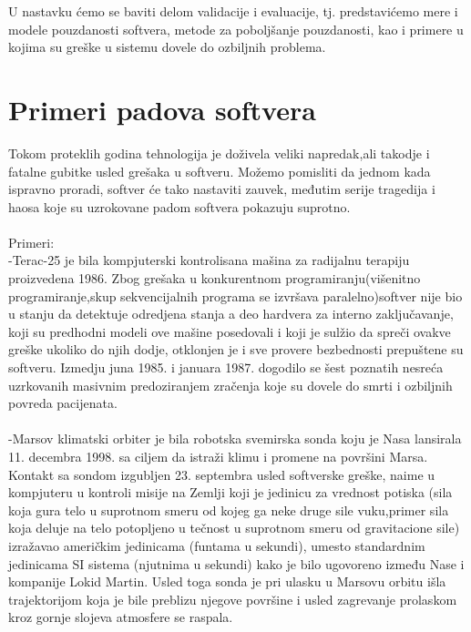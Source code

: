 \documentclass[a4paper]{article}
\begin{document}
U nastavku ćemo se baviti delom validacije i evaluacije, tj. predstavićemo mere i modele pouzdanosti softvera, metode za poboljšanje pouzdanosti, kao i primere u kojima su greške u sistemu dovele do ozbiljnih problema.

\section{Primeri padova softvera}
\label{sec:primeri}

Tokom proteklih godina tehnologija je doživela veliki napredak,ali takodje i fatalne gubitke usled grešaka u softveru.
Možemo pomisliti da jednom kada ispravno proradi, softver će tako nastaviti zauvek, međutim serije tragedija i haosa koje su uzrokovane padom
softvera pokazuju suprotno. \\
\\
Primeri: \\

-Terac-25 je bila kompjuterski kontrolisana mašina za radijalnu terapiju proizvedena 1986.
Zbog grešaka u konkurentnom programiranju(višenitno programiranje,skup sekvencijalnih programa se izvršava paralelno)softver nije bio u stanju da detektuje odredjena stanja a deo hardvera za interno zaključavanje, koji su predhodni modeli ove mašine posedovali i koji je sulžio da spreči ovakve greške ukoliko do njih dodje, otklonjen je i sve provere bezbednosti prepuštene su softveru.
Izmedju juna 1985. i januara 1987. dogodilo se šest poznatih nesreća uzrkovanih masivnim predoziranjem zračenja koje su dovele do smrti i ozbiljnih povreda pacijenata.\\
\\

-Marsov klimatski orbiter je bila robotska svemirska sonda koju je Nasa lansirala 11. decembra 1998. sa ciljem da istraži klimu i promene na površini Marsa. Kontakt sa sondom izgubljen 23. septembra usled softverske greške, naime u kompjuteru u kontroli misije na Zemlji koji je jedinicu za vrednost potiska (sila koja gura telo u suprotnom smeru od kojeg ga neke druge sile vuku,primer sila koja deluje na telo potopljeno u tečnost u suprotnom smeru od gravitacione sile) izražavao američkim jedinicama (funtama u sekundi), umesto standardnim jedinicama SI sistema (njutnima u sekundi) kako je bilo ugovoreno između Nase i kompanije Lokid Martin. Usled toga sonda je pri ulasku u Marsovu orbitu išla trajektorijom koja je bile preblizu njegove površine i usled zagrevanje prolaskom kroz gornje slojeva atmosfere se raspala.\\
\\
\end{document}
